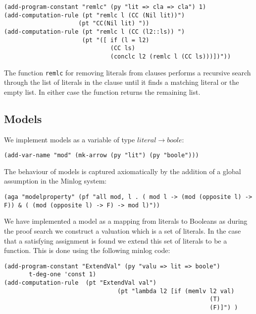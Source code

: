 \begin{lstlisting}[caption = "The Function Which Removes a Literal From a Clause"]
(add-program-constant "remlc" (py "lit => cla => cla") 1)
(add-computation-rule (pt "remlc l (CC (Nil lit))") 
                     (pt "CC(Nil lit) "))
(add-computation-rule (pt "remlc l (CC (l2::ls)) ")
                      (pt "([ if (l = l2)                                       
                              (CC ls)                                           
                              (conclc l2 (remlc l (CC ls)))])"))
\end{lstlisting}

The function \texttt{remlc} for removing literals from clauses performs a recursive search through the list of literals in the clause until it finds a matching literal or the empty list. In either case the function returns the remaining list.






\subsection*{Models}
We implement models as a variable of type $literal \to boole$:
\begin{center}
\texttt{(add-var-name "mod" (mk-arrow (py "lit") (py "boole")))}
\end{center}
The behaviour of models is captured axiomatically by the addition of a global assumption in the Minlog system:
\begin{center}
\texttt{(aga "modelproperty" (pf "all mod, l . ( mod l  -> (mod (opposite l) -> F)) \& ( (mod (opposite l) -> F) -> mod l)"))}
\end{center}
We have implemented a model as a mapping from literals to Booleans as during the proof search we construct a valuation which is a set of literals. In the case that a satisfying assignment is found we extend this set of literals to be a function. This is done using the following minlog code:

\begin{lstlisting}[caption = "The ExtendVal function in Minlog"]
(add-program-constant "ExtendVal" (py "valu => lit => boole") 
       t-deg-one 'const 1)
(add-computation-rule  (pt "ExtendVal val")  
                                (pt "lambda l2 [if (memlv l2 val)                                                                                                       
                                                          (T)                                                                                                                        
                                                          (F)]") )
\end{lstlisting}




